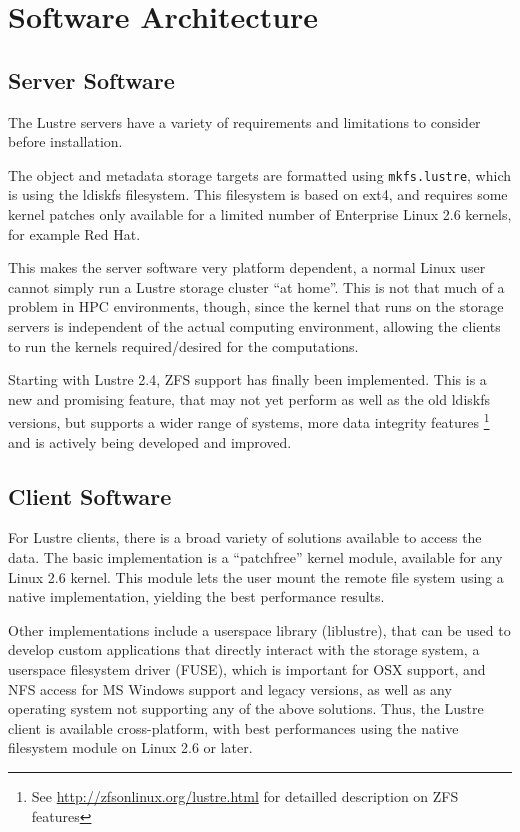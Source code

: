 \section{Software Architecture}

\subsection{Server Software}

The Lustre servers have a variety of requirements and limitations to consider
before installation.

The object and metadata storage targets are formatted using \texttt{mkfs.lustre},
which is using the ldiskfs filesystem. This filesystem is based on ext4, and
requires some kernel patches only available for a limited number of Enterprise
Linux 2.6 kernels, for example Red Hat.

This makes the server software very platform dependent, a normal Linux user
cannot simply run a Lustre storage cluster ``at home''. This is not that much of
a problem in HPC environments, though, since the kernel that runs on the storage
servers is independent of the actual computing environment, allowing the clients
to run the kernels required/desired for the computations.

Starting with Lustre 2.4, ZFS support has finally been implemented. This is a
new and promising feature, that may not yet perform as well as the old ldiskfs
versions, but supports a wider range of systems, more data integrity features
\footnote{See \url{http://zfsonlinux.org/lustre.html} for detailled description
on ZFS features} and is actively being developed and improved.

\subsection{Client Software}

For Lustre clients, there is a broad variety of solutions available to access
the data. The basic implementation is a ``patchfree'' kernel module, available
for any Linux 2.6 kernel. This module lets the user mount the remote file system
using a native implementation, yielding the best performance results.

Other implementations include a userspace library (liblustre), that can be used
to develop custom applications that directly interact with the storage system,
a userspace filesystem driver (FUSE), which is important for OSX support, and
NFS access for MS Windows support and legacy versions, as well as any operating
system not supporting any of the above solutions.
Thus, the Lustre client is available cross-platform, with best performances
using the native filesystem module on Linux 2.6 or later.

